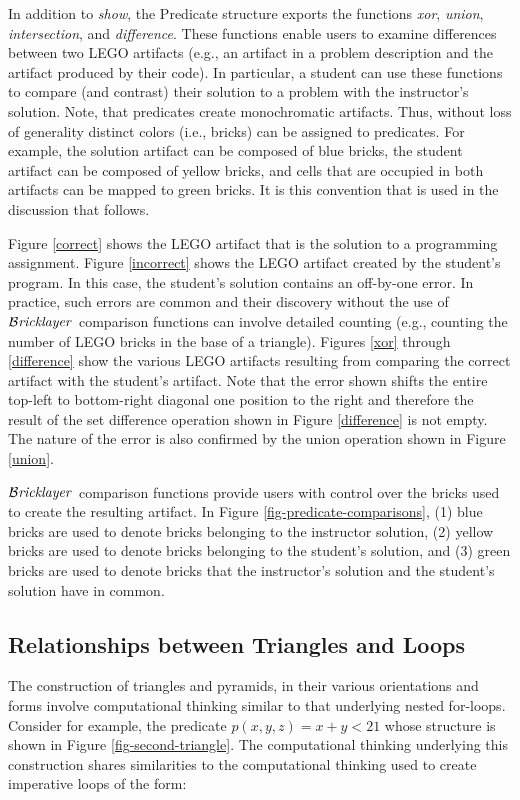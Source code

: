 \documentclass[submission,copyright,creativecommons]{eptcs}
\newcommand{\bricklayer}{\ensuremath{\mathcal{B}\emph{ricklayer}}}
\begin{document}
In addition to \emph{show}, the Predicate structure exports the functions \emph{xor}, \emph{union}, \emph{intersection},  and \emph{difference}. These functions enable users to examine differences between two LEGO artifacts (e.g., an artifact in a problem description and the artifact produced by their code). In particular, a student can use these functions to compare (and contrast) their solution to a problem with the instructor's solution. Note, that predicates create monochromatic artifacts. Thus, without loss of generality distinct colors (i.e., bricks) can be assigned to predicates. For example, the solution artifact can be composed of blue bricks, the student artifact can be composed of yellow bricks, and cells that are occupied in both artifacts can be mapped to green bricks. It is this convention that is used in the discussion that follows.

Figure \ref{correct} shows the LEGO artifact that is the solution to a programming assignment. Figure \ref{incorrect} shows the LEGO artifact created by the student's program. In this case, the student's solution contains an off-by-one error. In practice, such errors are common and their discovery without the use of \bricklayer\ comparison functions can involve detailed counting (e.g., counting the number of LEGO bricks in the base of a triangle). Figures \ref{xor} through \ref{difference} show the various LEGO artifacts resulting from comparing the correct artifact with the student's artifact. Note that the error shown shifts the entire top-left to bottom-right diagonal one position to the right and therefore the result of the set difference operation shown in Figure \ref{difference} is not empty. The nature of the error is also confirmed by the union operation shown in Figure \ref{union}.

\bricklayer\ comparison functions provide users with control over the bricks used to create the resulting artifact. In Figure \ref{fig-predicate-comparisons}, (1) blue bricks are used to denote bricks belonging to the instructor solution, (2) yellow bricks are used to denote bricks belonging to the student's solution, and (3) green bricks are used to denote bricks that the instructor's solution and the student's solution have in common.




\subsection{Relationships between Triangles and Loops}
The construction of triangles and pyramids, in their various orientations and forms involve computational thinking similar to that underlying nested for-loops. Consider for example, the predicate $p(x,y,z) = x + y < 21$ whose structure is shown in Figure \ref{fig-second-triangle}. The computational thinking underlying this construction shares similarities to the computational thinking used to create imperative loops of the form:
\end{document}
